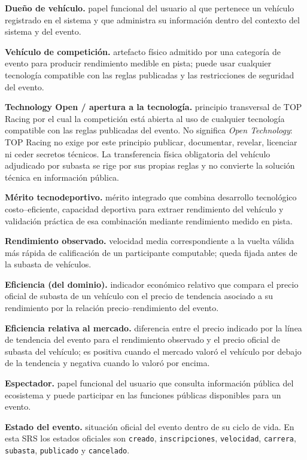 \documentclass[10pt,letterpaper]{article}
\begin{document}
\noindent\textbf{Dueño de vehículo.} papel funcional del usuario al que pertenece un vehículo registrado en el sistema y que administra su información dentro del contexto del sistema y del evento.\par
\noindent\textbf{Vehículo de competición.} artefacto físico admitido por una categoría de evento para producir rendimiento medible en pista; puede usar cualquier tecnología compatible con las reglas publicadas y las restricciones de seguridad del evento.\par
\noindent\textbf{Technology Open / apertura a la tecnología.} principio transversal de TOP Racing por el cual la competición está abierta al uso de cualquier tecnología compatible con las reglas publicadas del evento. No significa \emph{Open Technology}: TOP Racing no exige por este principio publicar, documentar, revelar, licenciar ni ceder secretos técnicos. La transferencia física obligatoria del vehículo adjudicado por subasta se rige por sus propias reglas y no convierte la solución técnica en información pública.\par
\noindent\textbf{Mérito tecnodeportivo.} mérito integrado que combina desarrollo tecnológico costo--eficiente, capacidad deportiva para extraer rendimiento del vehículo y validación práctica de esa combinación mediante rendimiento medido en pista.\par
\noindent\textbf{Rendimiento observado.} velocidad media correspondiente a la vuelta válida más rápida de calificación de un participante computable; queda fijada antes de la subasta de vehículos.\par
\noindent\textbf{Eficiencia (del dominio).} indicador económico relativo que compara el precio oficial de subasta de un vehículo con el precio de tendencia asociado a su rendimiento por la relación precio--rendimiento del evento.\par
\noindent\textbf{Eficiencia relativa al mercado.} diferencia entre el precio indicado por la línea de tendencia del evento para el rendimiento observado y el precio oficial de subasta del vehículo; es positiva cuando el mercado valoró el vehículo por debajo de la tendencia y negativa cuando lo valoró por encima.\par
\noindent\textbf{Espectador.} papel funcional del usuario que consulta información pública del ecosistema y puede participar en las funciones públicas disponibles para un evento.\par
\noindent\textbf{Estado del evento.} situación oficial del evento dentro de su ciclo de vida. En esta SRS los estados oficiales son \texttt{creado}, \texttt{inscripciones}, \texttt{velocidad}, \texttt{carrera}, \texttt{subasta}, \texttt{publicado} y \texttt{cancelado}.\par
\end{document}
